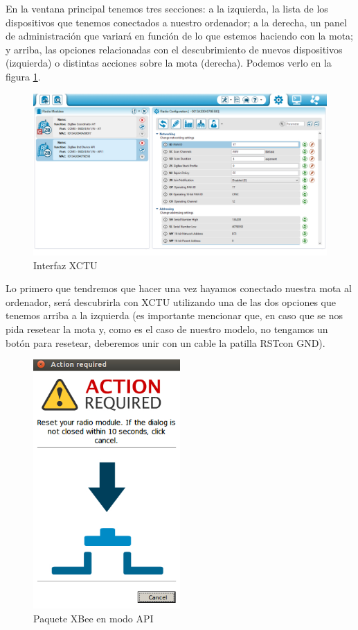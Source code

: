 En la ventana principal tenemos tres secciones: a la izquierda, la lista de los dispositivos
que tenemos conectados a nuestro ordenador; a la derecha, un panel de administración que variará
en función de lo que estemos haciendo con la mota; y arriba, las opciones relacionadas con el descubrimiento
de nuevos dispositivos (izquierda) o distintas acciones sobre la mota (derecha). Podemos verlo en la figura \ref{fig:interfaz1}.\\

\begin{figure}[htb]
\centering
\includegraphics[width=1\textwidth]{./imagenes/interfaz1}
\caption{Interfaz XCTU} \label{fig:interfaz1}
\end{figure}

Lo primero que tendremos que hacer una vez hayamos conectado nuestra mota al ordenador, será descubrirla con XCTU
utilizando una de las dos opciones que tenemos arriba a la izquierda (es importante mencionar que, en caso que se nos
pida resetear la mota y, como es el caso de nuestro modelo, no tengamos un botón para resetear, deberemos unir con un
cable la patilla \guillemotleft RST\guillemotright con \guillemotleft GND\guillemotright).\\

\begin{figure}[htb]
\centering
\includegraphics[width=0.5\textwidth]{./imagenes/xctureset}
\caption{Paquete XBee en modo API} \label{fig:xctureset}
\end{figure}

